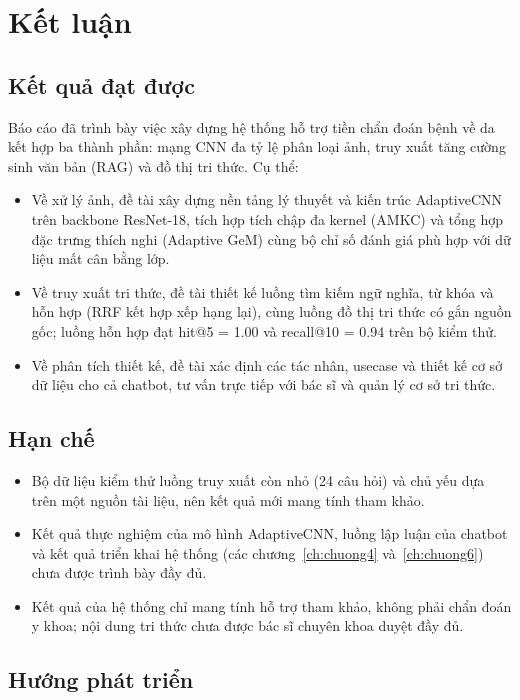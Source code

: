 \chapter{Kết luận}
\label{ch:chuong7}

\section{Kết quả đạt được}

Báo cáo đã trình bày việc xây dựng hệ thống hỗ trợ tiền chẩn đoán bệnh về da kết hợp ba thành phần: mạng CNN đa tỷ lệ phân loại ảnh, truy xuất tăng cường sinh văn bản (RAG) và đồ thị tri thức. Cụ thể:
\begin{itemize}
  \item Về xử lý ảnh, đề tài xây dựng nền tảng lý thuyết và kiến trúc AdaptiveCNN trên backbone ResNet-18, tích hợp tích chập đa kernel (AMKC) và tổng hợp đặc trưng thích nghi (Adaptive GeM) cùng bộ chỉ số đánh giá phù hợp với dữ liệu mất cân bằng lớp.
  \item Về truy xuất tri thức, đề tài thiết kế luồng tìm kiếm ngữ nghĩa, từ khóa và hỗn hợp (RRF kết hợp xếp hạng lại), cùng luồng đồ thị tri thức có gắn nguồn gốc; luồng hỗn hợp đạt hit@5 = 1.00 và recall@10 = 0.94 trên bộ kiểm thử.
  \item Về phân tích thiết kế, đề tài xác định các tác nhân, usecase và thiết kế cơ sở dữ liệu cho cả chatbot, tư vấn trực tiếp với bác sĩ và quản lý cơ sở tri thức.
\end{itemize}

\section{Hạn chế}

\begin{itemize}
  \item Bộ dữ liệu kiểm thử luồng truy xuất còn nhỏ (24 câu hỏi) và chủ yếu dựa trên một nguồn tài liệu, nên kết quả mới mang tính tham khảo.
  \item Kết quả thực nghiệm của mô hình AdaptiveCNN, luồng lập luận của chatbot và kết quả triển khai hệ thống (các chương~\ref{ch:chuong4} và~\ref{ch:chuong6}) chưa được trình bày đầy đủ.
  \item Kết quả của hệ thống chỉ mang tính hỗ trợ tham khảo, không phải chẩn đoán y khoa; nội dung tri thức chưa được bác sĩ chuyên khoa duyệt đầy đủ.
\end{itemize}

\section{Hướng phát triển}

